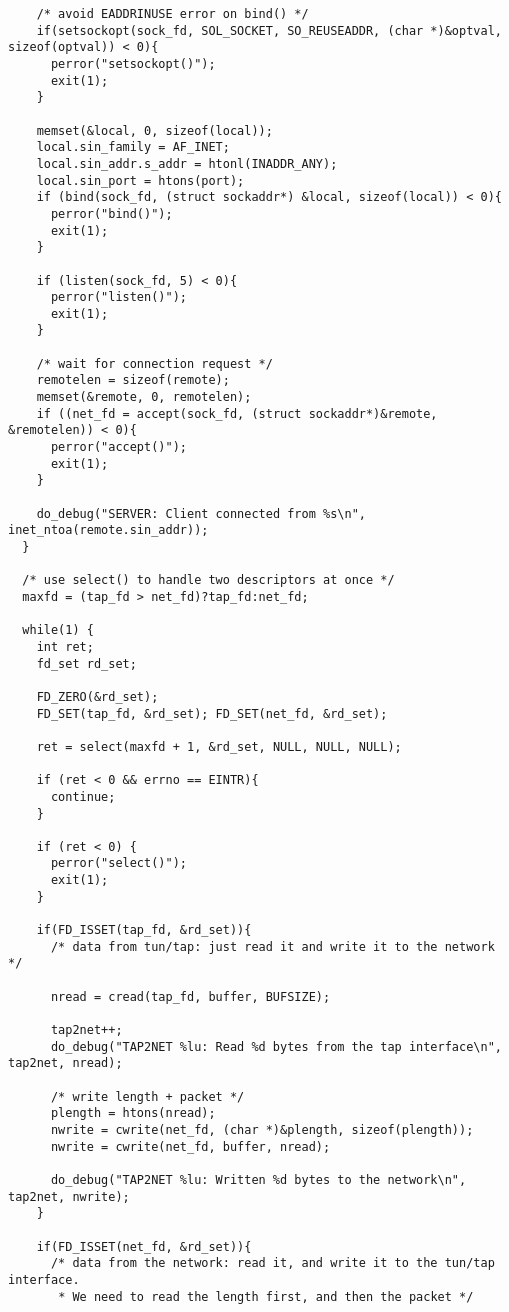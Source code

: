 \documentclass[a4paper,12pt]{article}
\begin{document}
\begin{verbatim}
    /* avoid EADDRINUSE error on bind() */
    if(setsockopt(sock_fd, SOL_SOCKET, SO_REUSEADDR, (char *)&optval, sizeof(optval)) < 0){
      perror("setsockopt()");
      exit(1);
    }
    
    memset(&local, 0, sizeof(local));
    local.sin_family = AF_INET;
    local.sin_addr.s_addr = htonl(INADDR_ANY);
    local.sin_port = htons(port);
    if (bind(sock_fd, (struct sockaddr*) &local, sizeof(local)) < 0){
      perror("bind()");
      exit(1);
    }
    
    if (listen(sock_fd, 5) < 0){
      perror("listen()");
      exit(1);
    }
    
    /* wait for connection request */
    remotelen = sizeof(remote);
    memset(&remote, 0, remotelen);
    if ((net_fd = accept(sock_fd, (struct sockaddr*)&remote, &remotelen)) < 0){
      perror("accept()");
      exit(1);
    }

    do_debug("SERVER: Client connected from %s\n", inet_ntoa(remote.sin_addr));
  }
  
  /* use select() to handle two descriptors at once */
  maxfd = (tap_fd > net_fd)?tap_fd:net_fd;

  while(1) {
    int ret;
    fd_set rd_set;

    FD_ZERO(&rd_set);
    FD_SET(tap_fd, &rd_set); FD_SET(net_fd, &rd_set);

    ret = select(maxfd + 1, &rd_set, NULL, NULL, NULL);

    if (ret < 0 && errno == EINTR){
      continue;
    }

    if (ret < 0) {
      perror("select()");
      exit(1);
    }

    if(FD_ISSET(tap_fd, &rd_set)){
      /* data from tun/tap: just read it and write it to the network */
      
      nread = cread(tap_fd, buffer, BUFSIZE);

      tap2net++;
      do_debug("TAP2NET %lu: Read %d bytes from the tap interface\n", tap2net, nread);

      /* write length + packet */
      plength = htons(nread);
      nwrite = cwrite(net_fd, (char *)&plength, sizeof(plength));
      nwrite = cwrite(net_fd, buffer, nread);
      
      do_debug("TAP2NET %lu: Written %d bytes to the network\n", tap2net, nwrite);
    }

    if(FD_ISSET(net_fd, &rd_set)){
      /* data from the network: read it, and write it to the tun/tap interface. 
       * We need to read the length first, and then the packet */


\end{verbatim}
\end{document}
